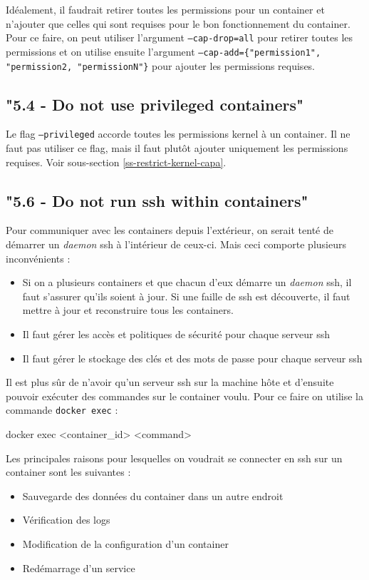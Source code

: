 \documentclass[11pt,a4paper,oneside]{report}
\newcommand{\code}[1]{\texttt{#1}}
\begin{document}
Idéalement, il faudrait retirer toutes les permissions pour un container et n'ajouter que celles qui sont requises pour le bon fonctionnement du container. Pour ce faire, on peut utiliser l'argument \code{--cap-drop=all} pour retirer toutes les permissions et on utilise ensuite l'argument \code{--cap-add=\{"permission1", "permission2, "permissionN"\}} pour ajouter les permissions requises.

\subsection{"5.4  - Do not use privileged containers"}
Le flag \code{--privileged} accorde toutes les permissions kernel à un container. Il ne faut pas utiliser ce flag, mais il faut plutôt ajouter uniquement les permissions requises. Voir sous-section \ref{ss-restrict-kernel-capa}.

\subsection{"5.6  - Do not run ssh within containers"}
Pour communiquer avec les containers depuis l'extérieur, on serait tenté de démarrer un \textit{daemon} ssh à l'intérieur de ceux-ci. Mais ceci comporte plusieurs inconvénients :

\begin{itemize}
\item Si on a plusieurs containers et que chacun d'eux démarre un \textit{daemon} ssh, il faut s'assurer qu'ils soient à jour. Si une faille de ssh est découverte, il faut mettre à jour et reconstruire tous les containers.
\item Il faut gérer les accès et politiques de sécurité pour chaque serveur ssh
\item Il faut gérer le stockage des clés et des mots de passe pour chaque serveur ssh
\end{itemize}

Il est plus sûr de n'avoir qu'un serveur ssh sur la machine hôte et d'ensuite pouvoir exécuter des commandes sur le container voulu. Pour ce faire on utilise la commande \code{docker exec} :

\begin{textcode}
docker exec <container_id> <command>
\end{textcode}

Les principales raisons pour lesquelles on voudrait se connecter en ssh sur un container sont les suivantes :
\begin{itemize}
\item Sauvegarde des données du container dans un autre endroit
\item Vérification des logs
\item Modification de la configuration d'un container
\item Redémarrage d'un service
\end{itemize}
\end{document}
